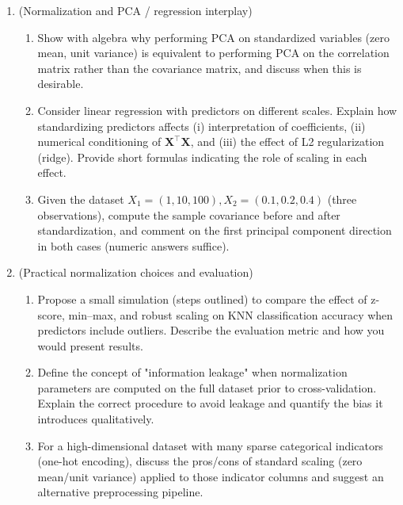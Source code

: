 \documentclass[12pt,a4paper]{article}
\begin{document}
\begin{enumerate}[label=(\arabic*)]
\item (Normalization and PCA / regression interplay)
    \begin{enumerate}[label=(\alph*)]
    \item Show with algebra why performing PCA on standardized variables (zero mean, unit variance) is equivalent to performing PCA on the correlation matrix rather than the covariance matrix, and discuss when this is desirable.
    \item Consider linear regression with predictors on different scales. Explain how standardizing predictors affects (i) interpretation of coefficients, (ii) numerical conditioning of \(\mathbf{X}^\top\mathbf{X}\), and (iii) the effect of L2 regularization (ridge). Provide short formulas indicating the role of scaling in each effect.
    \item Given the dataset \(X_1=(1,10,100), X_2=(0.1,0.2,0.4)\) (three observations), compute the sample covariance before and after standardization, and comment on the first principal component direction in both cases (numeric answers suffice).
    \end{enumerate}

\item (Practical normalization choices and evaluation)
    \begin{enumerate}[label=(\alph*)]
    \item Propose a small simulation (steps outlined) to compare the effect of z-score, min–max, and robust scaling on KNN classification accuracy when predictors include outliers. Describe the evaluation metric and how you would present results.
    \item Define the concept of "information leakage" when normalization parameters are computed on the full dataset prior to cross-validation. Explain the correct procedure to avoid leakage and quantify the bias it introduces qualitatively.
    \item For a high-dimensional dataset with many sparse categorical indicators (one-hot encoding), discuss the pros/cons of standard scaling (zero mean/unit variance) applied to those indicator columns and suggest an alternative preprocessing pipeline.
    \end{enumerate}
\end{enumerate}


\end{document}
